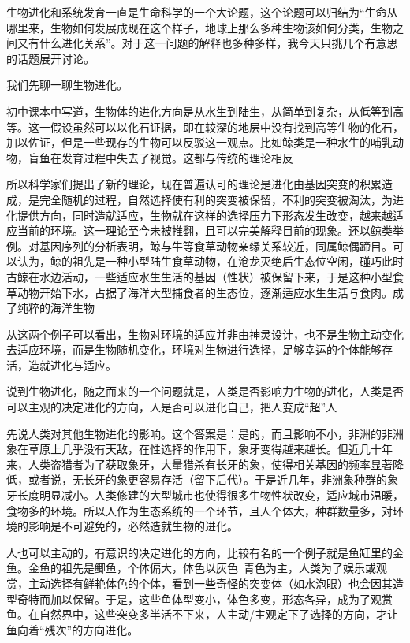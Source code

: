 \documentclass[UTF8]{ctexart}
\begin{document}
\newpage
生物进化和系统发育一直是生命科学的一个大论题，这个论题可以归结为“生命从哪里来，生物如何发展成现在这个样子，地球上那么多种生物该如何分类，生物之间又有什么进化关系”。对于这一问题的解释也多种多样，我今天只挑几个有意思的话题展开讨论。\par
我们先聊一聊生物进化。\par 初中课本中写道，生物体的进化方向是从水生到陆生，从简单到复杂，从低等到高等。这一假设虽然可以以化石证据，即在较深的地层中没有找到高等生物的化石，加以佐证，但是一些现存的生物可以反驳这一观点。比如鲸类是一种水生的哺乳动物，盲鱼在发育过程中失去了视觉。这都与传统的理论相反\par 所以科学家们提出了新的理论，现在普遍认可的理论是进化由基因突变的积累造成，是完全随机的过程，自然选择使有利的突变被保留，不利的突变被淘汰，为进化提供方向，同时造就适应，生物就在这样的选择压力下形态发生改变，越来越适应当前的环境。这一理论至今未被推翻，且可以完美解释目前的现象。还以鲸类举例。对基因序列的分析表明，鲸与牛等食草动物亲缘关系较近，同属鲸偶蹄目。可以认为，鲸的祖先是一种小型陆生食草动物，在沧龙灭绝后生态位空闲，碰巧此时古鲸在水边活动，一些适应水生生活的基因（性状）被保留下来，于是这种小型食草动物开始下水，占据了海洋大型捕食者的生态位，逐渐适应水生生活与食肉。成了纯粹的海洋生物\par
从这两个例子可以看出，生物对环境的适应并非由神灵设计，也不是生物主动变化去适应环境，而是生物随机变化，环境对生物进行选择，足够幸运的个体能够存活，造就进化与适应。\par
说到生物进化，随之而来的一个问题就是，人类是否影响力生物的进化，人类是否可以主观的决定进化的方向，人是否可以进化自己，把人变成“超”人\par
先说人类对其他生物进化的影响。这个答案是：是的，而且影响不小，非洲的非洲象在草原上几乎没有天敌，在性选择的作用下，象牙变得越来越长。但近几十年来，人类盗猎者为了获取象牙，大量猎杀有长牙的象，使得相关基因的频率显著降低，或者说，无长牙的象更容易存活（留下后代）。于是近几年，非洲象种群的象牙长度明显减小。人类修建的大型城市也使得很多生物性状改变，适应城市温暖，食物多的环境。所以人作为生态系统的一个环节，且人个体大，种群数量多，对环境的影响是不可避免的，必然造就生物的进化。\par
人也可以主动的，有意识的决定进化的方向，比较有名的一个例子就是鱼缸里的金鱼。金鱼的祖先是鲫鱼，个体偏大，体色以灰色\ 青色为主，人类为了娱乐或观赏，主动选择有鲜艳体色的个体，看到一些奇怪的突变体（如水泡眼）也会因其造型奇特而加以保留。于是，这些鱼体型变小，体色多变，形态各异，成为了观赏鱼。在自然界中，这些突变多半活不下来，人主动/主观定下了选择的方向，才让鱼向着“残次”的方向进化。\par
\end{document}
